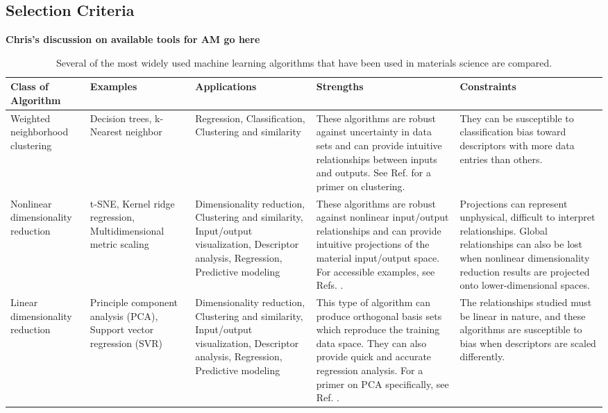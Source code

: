 \subsection{Selection Criteria}
\textbf{Chris's discussion on available tools for AM go here}

\begin{table*}[t]
\caption{Several of the most widely used machine learning algorithms that have been used in materials science are compared.} \label{ML}
\begin{tabular}{p{2.25cm}|p{2.25cm}|p{3cm}|p{4cm}|p{4cm}}
\raggedright Class of Algorithm & Examples & Applications & Strengths & Constraints \\ \hline \hline
Weighted neighborhood clustering & Decision trees, k-Nearest neighbor & \raggedright Regression, Classification, Clustering and similarity & These algorithms are robust against uncertainty in data sets and can provide intuitive relationships between inputs and outputs. See Ref. \cite{Quinlan1986} for a primer on clustering. & They can be susceptible to classification bias toward descriptors with more data entries than others. \\ \hline

\raggedright Nonlinear dimensionality reduction & \raggedright t-SNE, Kernel ridge regression, Multidimensional metric scaling &\raggedright  Dimensionality reduction, Clustering and similarity, Input/output visualization, Descriptor analysis, Regression, Predictive modeling &\raggedright These algorithms are robust against nonlinear input/output relationships and can provide intuitive projections of the material input/output space. For accessible examples, see Refs. \cite{Tenenbaum2000, Roweis2000}. & Projections can represent unphysical, difficult to interpret relationships. Global relationships can also be lost when nonlinear dimensionality reduction results are projected onto lower-dimensional spaces.\\ \hline

\raggedright Linear dimensionality reduction & \raggedright Principle component analysis (PCA), Support vector regression (SVR) & Dimensionality reduction, Clustering and similarity, Input/output visualization, Descriptor analysis, Regression, Predictive modeling & \raggedright This type of algorithm can produce orthogonal basis sets which reproduce the training data space. They can also provide quick and accurate regression analysis. For a primer on PCA specifically, see Ref. \cite{Bro2014}. & The relationships studied must be linear in nature, and these algorithms are susceptible to bias when descriptors are scaled differently. \\ \hline


\end{tabular}
\end{table*}
